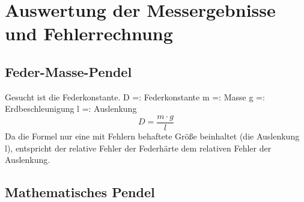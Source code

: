 \newpage
\section{ Auswertung der Messergebnisse und Fehlerrechnung}

\subsection{Feder-Masse-Pendel}
Gesucht ist die Federkonstante.
\newline
D =: Federkonstante
\newline
m =: Masse
\newline
g =: Erdbeschleunigung
\newline
l =: Auslenkung
\begin{equation}
D = \frac{m\cdot g}{l}
\end{equation}
Da die Formel nur eine mit Fehlern behaftete Größe beinhaltet (die Auslenkung l), entspricht der relative Fehler der Federhärte dem relativen Fehler der Auslenkung.
\begin{table}[thb]
	\centering
	\hline
\end{table}


\subsection{Mathematisches Pendel}


%    

